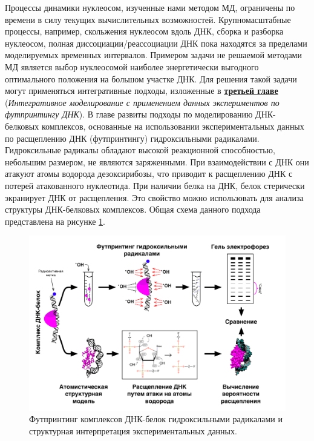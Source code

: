 Процессы динамики нуклеосом, изученные нами методом МД, ограничены по времени в силу текущих вычислительных возможностей. Крупномасштабные процессы, например, скольжения нуклеосом вдоль ДНК, сборка и разборка нуклеосом, полная диссоциации/реассоциации ДНК пока находятся за пределами моделируемых временных интервалов. Примером задачи не решаемой методами МД является выбор нуклеосомой наиболее энергетически выгодного оптимального положения на большом участке ДНК. Для решения такой задачи могут применяться интегративные подходы, изложенные в \underline{\textbf{третьей главе}} (\textit{Интегративное моделирование с применением данных экспериментов по футпринтингу ДНК}). В главе развиты подходы по моделированию ДНК-белковых комплексов, основанные на использовании экспериментальных данных по расщеплению ДНК (футпринтингу) гидроксильными радикалами. Гидроксильные радикалы обладают высокой реакционной способностью, небольшим размером, не являются заряженными. При взаимодействии с ДНК они атакуют атомы водорода дезоксирибозы, что приводит к расщеплению ДНК с потерей атакованного нуклеотида. При наличии белка на ДНК, белок стерически экранирует ДНК от расщепления. Это свойство можно использовать для анализа структуры ДНК-белковых комплексов. Общая схема данного подхода представлена на рисунке \ref{fig:p5_1_f1}.



\begin{figure} [H]
    \centering
    \includegraphics[width=\textwidth]{images/p5/part5_1_np/p5_1_f1.pdf}
    \caption[Футпринтинг комплексов ДНК-белок гидроксильными радикалами и структурная интерпретация экспериментальных данных.]{Футпринтинг комплексов ДНК-белок гидроксильными радикалами и структурная интерпретация экспериментальных данных. }
    \label{fig:p5_1_f1}
\end{figure}

